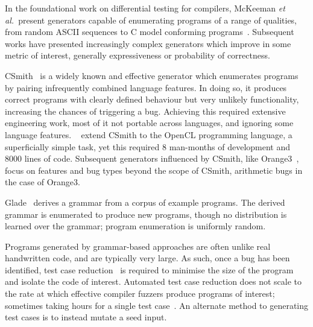 In the foundational work on differential testing for compilers, McKeeman \emph{et al.\ }present generators capable of enumerating programs of a range of qualities, from random ASCII sequences to C model conforming programs~\cite{McKeeman1998}. Subsequent works have presented increasingly complex generators which improve in some metric of interest, generally expressiveness or probability of correctness.

CSmith~\cite{Yang2011} is a widely known and effective generator which enumerates programs by pairing infrequently combined language features. In doing so, it produces correct programs with clearly defined behaviour but very unlikely functionality, increasing the chances of triggering a bug. Achieving this required extensive engineering work, most of it not portable across languages, and ignoring some language features.
\citeauthor{Lidbury2015a}~\cite{Lidbury2015a} extend CSmith to the OpenCL programming language, a superficially simple task, yet this required 8 man-months of development and 8000 lines of code.
Subsequent generators influenced by CSmith, like Orange3~\cite{Nagai2013}, focus on features and bug types beyond the scope of CSmith, arithmetic bugs in the case of Orange3.

Glade~\cite{Bastani2017} derives a grammar from a corpus of example programs. The derived grammar is enumerated to produce new programs, though no distribution is learned over the grammar; program enumeration is uniformly random.

Programs generated by grammar-based approaches are often unlike real handwritten code, and are typically very large. As such, once a bug has been identified, test case reduction~\cite{Regehr2012a} is required to minimise the size of the program and isolate the code of interest. Automated test case reduction does not scale to the rate at which effective compiler fuzzers produce programs of interest; sometimes taking hours for a single test case~\cite{Pflanzer2016}. An alternate method to generating test cases is to instead mutate a seed input.

